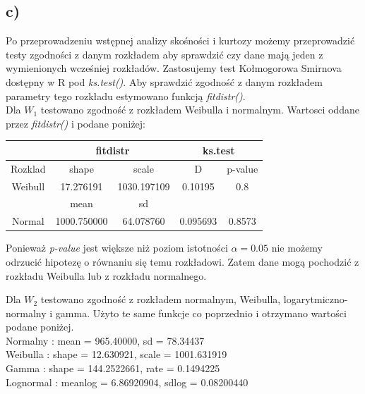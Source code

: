 \documentclass{article}
\begin{document}
\subsection{c)}
Po przeprowadzeniu wstępnej analizy skośności i kurtozy możemy przeprowadzić testy zgodności z danym rozkładem aby sprawdzić czy dane mają jeden z wymienionych wcześniej rozkładów. Zastosujemy test Kołmogorowa Smirnova dostępny w R pod \textit{ks.test()}. Aby sprawdzić zgodność z danym rozkładem parametry tego rozkładu estymowano funkcją \textit{fitdistr()}. \\

Dla $W_1$ testowano zgodność z rozkładem Weibulla i normalnym. Wartosci oddane przez \textit{fitdistr()} i  podane poniżej:
\begin{center} \begin{tabular}{|c|c|c|c|c|} \hline
& \multicolumn{2}{|c|}{fitdistr} & \multicolumn{2}{|c|}{ks.test} \\ \hline
Rozklad & shape & scale & D & p-value \\ \hline
Weibull & 17.276191 & 1030.197109 & 0.10195 & 0.8 \\ \hline
& mean & sd & & \\ \hline
Normal & 1000.750000 & 64.078760 & 0.095693 & 0.8573 \\ \hline
\end{tabular} \end{center}
Ponieważ \textit{p-value} jest większe niż poziom istotności $\alpha = 0.05$ nie możemy odrzucić hipotezę o równaniu się temu rozkładowi. Zatem dane mogą pochodzić z rozkładu Weibulla lub z rozkładu normalnego. \\ \par

Dla $W_2$ testowano zgodność z rozkładem normalnym, Weibulla, logarytmiczno-normalny i gamma. Użyto te same funkcje co poprzednio i otrzymano wartości podane poniżej. \\
Normalny : mean  = 965.40000,  sd = 78.34437 \\
Weibulla : shape = 12.630921, scale = 1001.631919 \\ 
Gamma : shape = 144.2522661, rate = 0.1494225 \\
Lognormal : meanlog = 6.86920904, sdlog = 0.08200440
\end{document}
